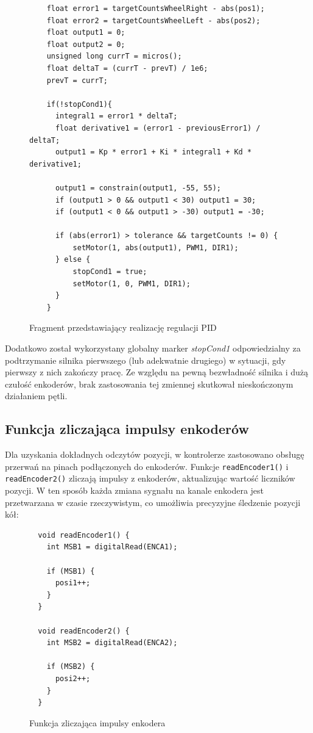 \begin{figure}[h!]
  \centering
  \begin{lstlisting}
    float error1 = targetCountsWheelRight - abs(pos1);
    float error2 = targetCountsWheelLeft - abs(pos2);
    float output1 = 0;
    float output2 = 0;
    unsigned long currT = micros();
    float deltaT = (currT - prevT) / 1e6;
    prevT = currT;

    if(!stopCond1){
      integral1 = error1 * deltaT;
      float derivative1 = (error1 - previousError1) / deltaT;
      output1 = Kp * error1 + Ki * integral1 + Kd * derivative1;

      output1 = constrain(output1, -55, 55);
      if (output1 > 0 && output1 < 30) output1 = 30;
      if (output1 < 0 && output1 > -30) output1 = -30;

      if (abs(error1) > tolerance && targetCounts != 0) {
          setMotor(1, abs(output1), PWM1, DIR1);
      } else {
          stopCond1 = true;
          setMotor(1, 0, PWM1, DIR1);
      }
    }
  \end{lstlisting}
  \caption{Fragment przedstawiający realizację regulacji PID}
  \label{fig:pseudokod:pid}
\end{figure}

Dodatkowo został wykorzystany globalny marker \textit{stopCond1} odpowiedzialny za podtrzymanie silnika pierwszego (lub adekwatnie drugiego) w sytuacji, gdy pierwszy z nich zakończy pracę. Ze względu na pewną bezwładność silnika i dużą czułość enkoderów, brak zastosowania tej zmiennej skutkował nieskończonym działaniem pętli. 

\subsection{Funkcja zliczająca impulsy enkoderów}

Dla uzyskania dokładnych odczytów pozycji, w kontrolerze zastosowano obsługę przerwań na pinach podłączonych do enkoderów. Funkcje \texttt{readEncoder1()} i \texttt{readEncoder2()} zliczają impulsy z enkoderów, aktualizując wartość liczników pozycji. W ten sposób każda zmiana sygnału na kanale enkodera jest przetwarzana w czasie rzeczywistym, co umożliwia precyzyjne śledzenie pozycji kół:

\begin{figure}[h!]
  \centering
  \begin{lstlisting}   
  void readEncoder1() {
    int MSB1 = digitalRead(ENCA1);

    if (MSB1) {  
      posi1++;  
    }
  }

  void readEncoder2() {
    int MSB2 = digitalRead(ENCA2);

    if (MSB2) {  
      posi2++; 
    }
  }
  \end{lstlisting}
  \caption{Funkcja zliczająca impulsy enkodera}
  \label{fig:enc-count}
\end{figure}

